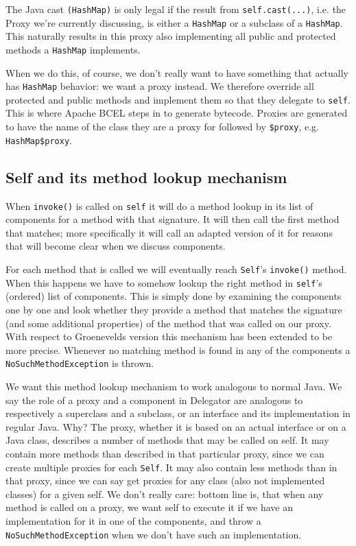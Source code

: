 \documentclass[a4paper,12pt]{book}
\begin{document}
The Java cast \verb|(HashMap)| is only legal if the result from \verb|self.cast(...)|, i.e. the Proxy we're currently discussing, is either a \verb|HashMap| or a subclass of a \verb|HashMap|. This naturally results in this proxy also implementing all public and protected methods a \verb|HashMap| implements.

When we do this, of course, we don't really want to have something that actually has \verb|HashMap| behavior: we want a proxy instead. We therefore override all protected and public methods and implement them so that they delegate to \verb|self|. This is where Apache BCEL steps in to generate bytecode. Proxies are generated to have the name of the class they are a proxy for followed by \verb|$proxy|, e.g. \verb|HashMap$proxy|.

\subsection*{Self and its method lookup mechanism}
When \verb|invoke()| is called on \verb|self| it will do a method lookup in its list of components for a method with that signature. It will then call the first method that matches; more specifically it will call an adapted version of it for reasons that will become clear when we discuss components.

For each method that is called we will eventually reach \verb|Self|'s \verb|invoke()| method. When this happens we have to somehow lookup the right method in \verb|self|'s (ordered) list of components. This is simply done by examining the components one by one and look whether they provide a method that matches the signature (and some additional properties) of the method that was called on our proxy. With respect to Groenevelds version this mechanism has been extended to be more precise. Whenever no matching method is found in any of the components a \verb|NoSuchMethodException| is thrown.

We want this method lookup mechanism to work analogous to normal Java. We say the role of a proxy and a component in Delegator are analogous to respectively a superclass and a subclass, or an interface and its implementation in regular Java. Why? The proxy, whether it is based on an actual interface or on a Java class, describes a number of methods that may be called on self. It may contain more methods than described in that particular proxy, since we can create multiple proxies for each \verb|Self|. It may also contain less methods than in that proxy, since we can say get proxies for any class (also not implemented classes) for a given self. We don't really care: bottom line is, that when any method is called on a proxy, we want self to execute it if we have an implementation for it in one of the components, and throw a \verb|NoSuchMethodException| when we don't have such an implementation.   
\end{document}
